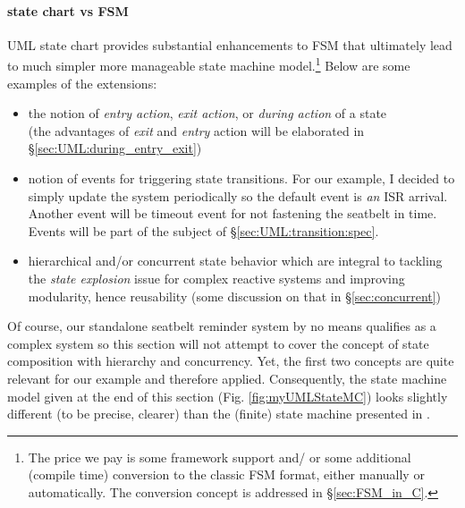 \documentclass[12pt,a4paper]{scrartcl}
\begin{document}
	\paragraph{state chart vs FSM}
	UML state chart provides substantial enhancements to FSM that ultimately lead to much simpler more manageable state machine model.\footnote{The price we pay is some framework support and/ or some additional (compile time) conversion to the classic FSM format, either manually or automatically.
	The conversion concept is addressed in \S \ref{sec:FSM_in_C}.}
	Below are some examples of the extensions:
	\begin{itemize}
		\item the notion of \textit{entry action}, 
			\textit{exit action}, or \textit{during action} of a state \\
			(the advantages of \textit{exit} and \textit{entry} action will be elaborated in \S \ref{sec:UML:during_entry_exit})
		\item notion of events for triggering state transitions.
			For our example, I decided to simply update the system periodically so the default event is \textit{an} ISR arrival.
			Another event will be timeout event for not fastening the seatbelt in time. Events will be part of the subject of \S \ref{sec:UML:transition:spec}.
		\item hierarchical and/or concurrent state behavior 
			which are integral to tackling the \textit{state explosion} issue for complex reactive systems and improving modularity, hence reusability (some discussion on that in \S \ref{sec:concurrent})
	\end{itemize}
		
	Of course, our standalone seatbelt reminder system by no means qualifies as a complex system so this section will not attempt to cover the concept of state composition with hierarchy and concurrency.
	Yet, the first two concepts are quite relevant for our example and therefore applied.
	Consequently, the state machine model given at the end of this section (Fig. \ref{fig:myUMLStateMC}) looks slightly different (to be precise, clearer) than the (finite) state machine presented in \cite{Wolf}.
	
	
\end{document}
